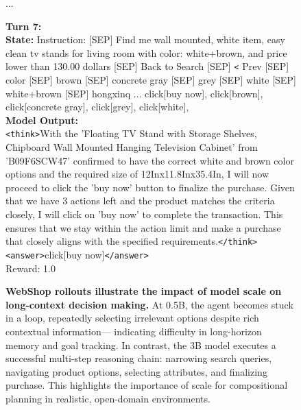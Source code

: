 \begin{figure}[t]
\begin{tcolorbox}[colback=gray!2, colframe=black, boxrule=0.5pt, arc=2pt, width=0.95\linewidth, title=3B WebShop – Multi-Turn Rollout]
\vspace{4pt}

...

\textbf{Turn 7:} \\
\textbf{State:}
Instruction: [SEP] Find me wall mounted, white item, easy clean tv stands for living room with color: white+brown, and price lower than 130.00 dollars [SEP] Back to Search [SEP] \texttt{<} Prev [SEP] color [SEP] brown [SEP] concrete gray [SEP] grey [SEP] white [SEP] white+brown [SEP] hongxinq ... click[buy now], click[brown], click[concrete gray], click[grey], click[white],\\
\textbf{Model Output:} \\
\texttt{<think>}With the 'Floating TV Stand with Storage Shelves, Chipboard Wall Mounted Hanging Television Cabinet' from 'B09F6SCW47' confirmed to have the correct white and brown color options and the required size of 12Inx11.8Inx35.4In, I will now proceed to click the 'buy now' button to finalize the purchase. Given that we have 3 actions left and the product matches the criteria closely, I will click on 'buy now' to complete the transaction. This ensures that we stay within the action limit and make a purchase that closely aligns with the specified requirements.\texttt{</think>} \\
\texttt{<answer>}click[buy now]\texttt{</answer>} \\
Reward: 1.0
\end{tcolorbox}
\caption{\textbf{WebShop rollouts illustrate the impact of model scale on long-context decision making.} 
At 0.5B, the agent becomes stuck in a loop, repeatedly selecting irrelevant options despite rich contextual information—
indicating difficulty in long-horizon memory and goal tracking. In contrast, the 3B model executes a successful multi-step 
reasoning chain: narrowing search queries, navigating product options, selecting attributes, and finalizing purchase. 
This highlights the importance of scale for compositional planning in realistic, open-domain environments.}
\label{fig:webshop-multiscale}
\end{figure}


